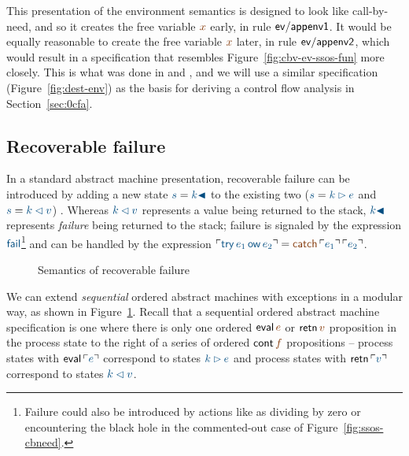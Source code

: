 This presentation of the environment semantics is designed to look
like call-by-need, and so it creates the free variable $\lf{x}$ early, in
rule ${\sf ev/appenv1}$.  It would be equally reasonable to create the
free variable $\lf{x}$ later, in rule ${\sf ev/appenv2}$, which would result
in a specification that resembles
Figure~\ref{fig:cbv-ev-ssos-fun} more closely. This is what
was done in \cite{pfenning09substructural} and
\cite{simmons11logical}, and we will use a similar specification 
(Figure~\ref{fig:dest-env}) as the 
basis for deriving a control flow analysis in Section~\ref{sec:0cfa}.

\subsection{Recoverable failure}
\label{sec:failure}

In a standard abstract machine presentation, recoverable failure can 
be introduced by adding a new state $\obj{s} = \obj{k {\blacktriangleleft}}$
to the existing two ($\obj{s} = \obj{k \rhd e}$ and $\obj{s} = \obj{k \lhd v}$)
\cite[Chapter 28]{harper12practical}. Whereas $\obj{k
\lhd v}$ represents a value being returned to the stack, $\obj{k
{\blacktriangleleft}}$ represents {\it failure} being returned to the
stack; failure is signaled by the expression $\obj{\sf fail}$\footnote{Failure 
could also be introduced by actions like as dividing
by zero or encountering the black hole in  the commented-out case of
Figure~\ref{fig:ssos-cbneed}.} and
can be handled by the expression $\interp{{\sf try}\,e_1\,{\sf ow}\,e_2} = 
\lf{{\sf catch}\,\interp{e_1}\,\interp{e_2}}$. 

\begin{figure}
\caption{Semantics of recoverable failure}
\label{fig:ssos-fail}
\end{figure}


We can extend {\it sequential} ordered abstract machines with
exceptions in a modular way, as shown in
Figure~\ref{fig:ssos-fail}. Recall that a sequential ordered abstract
machine specification is one where there is only one ordered ${\sf
  eval}\,\lf{e}$ 
or ${\sf retn}\,\lf{v}$ proposition in the process state to the
right of a series of ordered ${\sf cont}\,\lf{f}$ propositions -- process
states with ${\sf eval}\,\interp{e}$ correspond to states $\obj{k \rhd e}$
and process states with ${\sf retn}\,\interp{v}$ correspond to states
$\obj{k \lhd v}$. 

